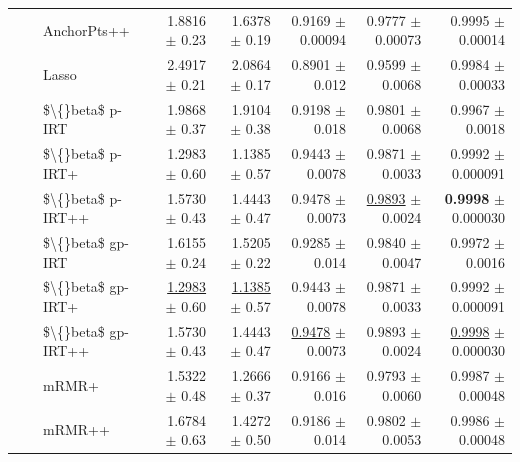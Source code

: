 \begin{longtable}{llp{}rrrrr}
 &  & AnchorPts++ & 1.8816 {\scriptsize $\pm$ 0.23} & 1.6378 {\scriptsize $\pm$ 0.19} & 0.9169 {\scriptsize $\pm$ 0.00094} & 0.9777 {\scriptsize $\pm$ 0.00073} & 0.9995 {\scriptsize $\pm$ 0.00014} \\
 &  & Lasso & 2.4917 {\scriptsize $\pm$ 0.21} & 2.0864 {\scriptsize $\pm$ 0.17} & 0.8901 {\scriptsize $\pm$ 0.012} & 0.9599 {\scriptsize $\pm$ 0.0068} & 0.9984 {\scriptsize $\pm$ 0.00033} \\
 &  & \$\textbackslash\{\}beta\$ p-IRT & 1.9868 {\scriptsize $\pm$ 0.37} & 1.9104 {\scriptsize $\pm$ 0.38} & 0.9198 {\scriptsize $\pm$ 0.018} & 0.9801 {\scriptsize $\pm$ 0.0068} & 0.9967 {\scriptsize $\pm$ 0.0018} \\
 &  & \$\textbackslash\{\}beta\$ p-IRT+ & 1.2983 {\scriptsize $\pm$ 0.60} & 1.1385 {\scriptsize $\pm$ 0.57} & 0.9443 {\scriptsize $\pm$ 0.0078} & 0.9871 {\scriptsize $\pm$ 0.0033} & 0.9992 {\scriptsize $\pm$ 0.000091} \\
 &  & \$\textbackslash\{\}beta\$ p-IRT++ & 1.5730 {\scriptsize $\pm$ 0.43} & 1.4443 {\scriptsize $\pm$ 0.47} & 0.9478 {\scriptsize $\pm$ 0.0073} & \underline{0.9893} {\scriptsize $\pm$ 0.0024} & \textbf{0.9998} {\scriptsize $\pm$ 0.000030} \\
 &  & \$\textbackslash\{\}beta\$ gp-IRT & 1.6155 {\scriptsize $\pm$ 0.24} & 1.5205 {\scriptsize $\pm$ 0.22} & 0.9285 {\scriptsize $\pm$ 0.014} & 0.9840 {\scriptsize $\pm$ 0.0047} & 0.9972 {\scriptsize $\pm$ 0.0016} \\
 &  & \$\textbackslash\{\}beta\$ gp-IRT+ & \underline{1.2983} {\scriptsize $\pm$ 0.60} & \underline{1.1385} {\scriptsize $\pm$ 0.57} & 0.9443 {\scriptsize $\pm$ 0.0078} & 0.9871 {\scriptsize $\pm$ 0.0033} & 0.9992 {\scriptsize $\pm$ 0.000091} \\
 &  & \$\textbackslash\{\}beta\$ gp-IRT++ & 1.5730 {\scriptsize $\pm$ 0.43} & 1.4443 {\scriptsize $\pm$ 0.47} & \underline{0.9478} {\scriptsize $\pm$ 0.0073} & 0.9893 {\scriptsize $\pm$ 0.0024} & \underline{0.9998} {\scriptsize $\pm$ 0.000030} \\
 &  & mRMR+ & 1.5322 {\scriptsize $\pm$ 0.48} & 1.2666 {\scriptsize $\pm$ 0.37} & 0.9166 {\scriptsize $\pm$ 0.016} & 0.9793 {\scriptsize $\pm$ 0.0060} & 0.9987 {\scriptsize $\pm$ 0.00048} \\
 &  & mRMR++ & 1.6784 {\scriptsize $\pm$ 0.63} & 1.4272 {\scriptsize $\pm$ 0.50} & 0.9186 {\scriptsize $\pm$ 0.014} & 0.9802 {\scriptsize $\pm$ 0.0053} & 0.9986 {\scriptsize $\pm$ 0.00048} \\
\end{longtable}